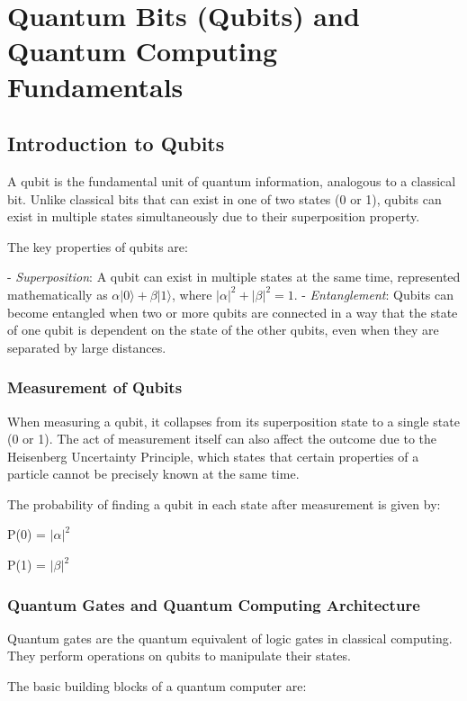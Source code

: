 \chapter{Quantum Bits (Qubits) and Quantum Computing Fundamentals}

\section{Introduction to Qubits}

A qubit is the fundamental unit of quantum information, analogous to a classical bit. Unlike classical bits that can exist in one of two states (0 or 1), qubits can exist in multiple states simultaneously due to their superposition property.

The key properties of qubits are:

- \textit{Superposition}: A qubit can exist in multiple states at the same time, represented mathematically as $\alpha |0\rangle + \beta |1\rangle$, where $|\alpha|^2 + |\beta|^2 = 1$.
- \textit{Entanglement}: Qubits can become entangled when two or more qubits are connected in a way that the state of one qubit is dependent on the state of the other qubits, even when they are separated by large distances.

\subsection{Measurement of Qubits}

When measuring a qubit, it collapses from its superposition state to a single state (0 or 1). The act of measurement itself can also affect the outcome due to the Heisenberg Uncertainty Principle, which states that certain properties of a particle cannot be precisely known at the same time.

The probability of finding a qubit in each state after measurement is given by:

P(0) = $|\alpha|^2$

P(1) = $|\beta|^2$

\subsection{Quantum Gates and Quantum Computing Architecture}

Quantum gates are the quantum equivalent of logic gates in classical computing. They perform operations on qubits to manipulate their states.

The basic building blocks of a quantum computer are:

